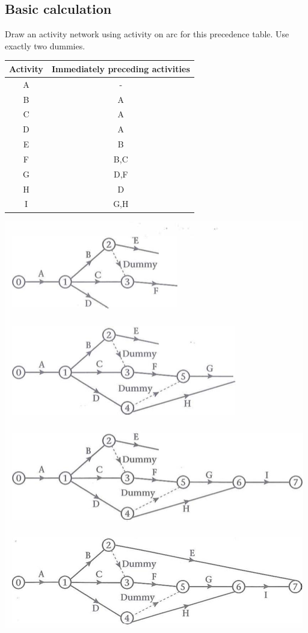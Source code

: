 \documentclass[a4paper]{article}
\begin{document}
\subsection{Basic calculation}
\begin{eg}
	Draw an activity network using activity on arc for this precedence table. Use exactly two dummies.\\
	\begin{center}
		\begin{tabular}{|c|c|}
			\hline
			Activity & Immediately preceding activities \\
			\hline
			A        & -                                \\
			\hline
			B        & A                                \\
			\hline
			C        & A                                \\
			\hline
			D        & A                                \\
			\hline
			E        & B                                \\
			\hline
			F        & B,C                              \\
			\hline
			G        & D,F                              \\
			\hline
			H        & D                                \\
			\hline
			I        & G,H                              \\
			\hline
		\end{tabular}
	\end{center}
	\begin{center}
		\includegraphics[scale=0.5]{img_D/5_4}

\end{center}
\end{eg}
\end{document}
